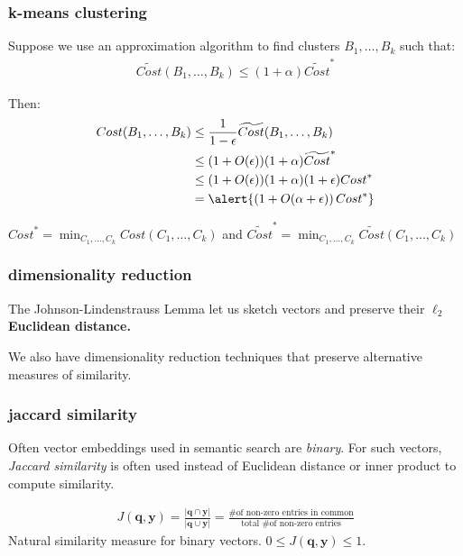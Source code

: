 \documentclass[compress]{beamer}
\newcommand{\bv}[1]{\mathbf{#1}}
\begin{document}
\begin{frame}[t]
	\frametitle{k-means clustering}
	Suppose we use an approximation algorithm to find clusters $B_1, \ldots, B_k$ such that:
	\begin{align*}
		\widetilde{Cost}(B_1,\ldots, B_k) \leq (1+\alpha)\widetilde{Cost}^*
	\end{align*}
	
	Then: 
	\begin{align*}
		{Cost}(B_1,\ldots, B_k) &\leq \frac{1}{1-\epsilon}\widetilde{Cost}(B_1,\ldots, B_k) \\
		&\leq(1+O(\epsilon)) (1+\alpha)\widetilde{Cost}^*\\
		&\leq (1+O(\epsilon))(1+\alpha)(1+\epsilon){Cost}^*\\
		&= \alert{\left(1 + O(\alpha + \epsilon)\right){Cost}^*}
	\end{align*}

	\vspace{1em}
\begin{block}{\vspace*{-3ex}}
	\small ${Cost}^* = \min_{C_1, \ldots, C_k} Cost(C_1, \ldots, C_k)$ and $\widetilde{Cost}^* = \min_{C_1, \ldots, C_k} \widetilde{Cost}(C_1, \ldots, C_k) $
\end{block}
\end{frame}


%
\begin{frame}
	\frametitle{dimensionality reduction}
	\begin{center}
		The Johnson-Lindenstrauss Lemma let us sketch vectors and preserve their \textbf{$\ell_2$ Euclidean distance.} 
		
		We also have dimensionality reduction techniques that preserve alternative measures of similarity.
	\end{center}
\end{frame}

\begin{frame}
	\frametitle{jaccard similarity}
	Often vector embeddings used in semantic search are \emph{binary}. For such vectors, \emph{Jaccard similarity} is often used instead of Euclidean distance or inner product to compute similarity.
	\begin{definition}
			\begin{align*}
					J(\bv{q},\bv{y}) = \frac{|\bv{q} \cap \bv{y}|}{|\bv{q} \cup \bv{y}|} = \frac{\text{\# of non-zero entries in common}}{\text{total \# of non-zero entries}}
				\end{align*}
			Natural similarity measure for binary vectors. $0\leq J(\bv{q},\bv{y})\leq 1$.
		\end{definition}
\end{frame}
\end{document}
